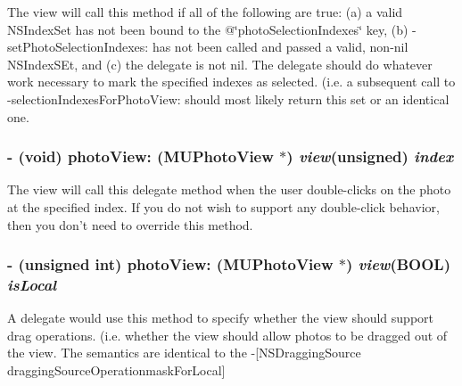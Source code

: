 The view will call this method if all of the following are true: (a) a valid NSIndex\-Set has not been bound to the @\char`\"{}photo\-Selection\-Indexes\char`\"{} key, (b) -set\-Photo\-Selection\-Indexes: has not been called and passed a valid, non-nil NSIndex\-SEt, and (c) the delegate is not nil. The delegate should do whatever work necessary to mark the specified indexes as selected. (i.e. a subsequent call to -selection\-Indexes\-For\-Photo\-View: should most likely return this set or an identical one. 
\subsubsection{\setlength{\rightskip}{0pt plus 5cm}- (void) photo\-View: ({\bf MUPhoto\-View} $\ast$) {\em view}(unsigned) {\em index}}\label{category_n_s_object(_m_u_photo_view_delegate)_b1d5136ccafab5ba223ab0f7ac70842f}


The view will call this delegate method when the user double-clicks on the photo at the specified index. If you do not wish to support any double-click behavior, then you don't need to override this method. 
\subsubsection{\setlength{\rightskip}{0pt plus 5cm}- (unsigned int) photo\-View: ({\bf MUPhoto\-View} $\ast$) {\em view}(BOOL) {\em is\-Local}}\label{category_n_s_object(_m_u_photo_view_delegate)_42f4131dee120657b393067d35c7c771}


A delegate would use this method to specify whether the view should support drag operations. (i.e. whether the view should allow photos to be dragged out of the view. The semantics are identical to the -[NSDragging\-Source dragging\-Source\-Operationmask\-For\-Local] 
